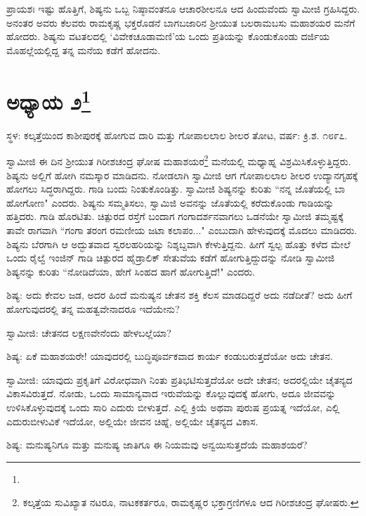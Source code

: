 ಪ್ರಾಯಶಃ ಇಷ್ಟು ಹೊತ್ತಿಗೆ, ಶಿಷ್ಯನು ಒಬ್ಬ ನಿಷ್ಠಾವಂತನೂ ಆಚಾರಶೀಲನೂ ಆದ ಹಿಂದುವೆಂದು ಸ್ವಾಮೀಜಿ ಗ್ರಹಿಸಿದ್ದರು. ಅನಂತರ ಅವರು ಕೆಲವರು ರಾಮಕೃಷ್ಣ ಭಕ್ತರೊಡನೆ ಬಾಗಬಜಾರಿನ ಶ‍್ರೀಯುತ ಬಲರಾಮಬಸು ಮಹಾಶಯರ ಮನೆಗೆ ಹೋದರು. ಶಿಷ್ಯನು ವಟತಲದಲ್ಲಿ ‘ವಿವೇಕಚೂಡಾಮಣಿ’ಯ ಒಂದು ಪ್ರತಿಯನ್ನು ಕೊಂಡುಕೊಂಡು ದರ್ಜಿಯ ಮೊಹಲ್ಲೆಯಲ್ಲಿದ್ದ ತನ್ನ ಮನೆಯ ಕಡೆಗೆ ಹೋದನು.

\newpage

\chapter[ಅಧ್ಯಾಯ ೨]{ಅಧ್ಯಾಯ ೨\protect\footnote{}}

\begin{center}
ಸ್ಥಳ: ಕಲ್ಕತ್ತೆಯಿಂದ ಕಾಶೀಪುರಕ್ಕೆ ಹೋಗುವ ದಾರಿ ಮತ್ತು ಗೋಪಾಲಲಾಲ ಶೀಲರ ತೋಟ, ವರ್ಷ: ಕ್ರಿ.ಶ. ೧೮೯೭.
\end{center}

ಸ್ವಾಮೀಜಿ ಈ ದಿನ ಶ‍್ರೀಯುತ ಗಿರೀಶಚಂದ್ರ ಘೋಷ ಮಹಾಶಯರ\footnote{ಕಲ್ಕತ್ತೆಯ ಸುವಿಖ್ಯಾತ ನಟರೂ, ನಾಟಕಕರ್ತರೂ, ರಾಮಕೃಷ್ಣರ ಭಕ್ತಾಗ್ರಣಿಗಳೂ ಆದ ಗಿರೀಶಚಂದ್ರ ಘೋಷರು.} ಮನೆಯಲ್ಲಿ ಮಧ್ಯಾಹ್ನ ವಿಶ್ರಮಿಸಿಕೊಳ್ಳುತ್ತಿದ್ದರು. ಶಿಷ್ಯನು ಅಲ್ಲಿಗೆ ಹೋಗಿ ನಮಸ್ಕಾರ ಮಾಡಿದನು. ನೋಡಲಾಗಿ ಸ್ವಾಮೀಜಿ ಆಗ ಗೋಪಾಲಲಾಲ ಶೀಲರ ಉದ್ಯಾನಗೃಹಕ್ಕೆ ಹೋಗಲು ಸಿದ್ಧರಾಗಿದ್ದರು. ಗಾಡಿ ಬಂದು ನಿಂತುಕೊಂಡಿತ್ತು. ಸ್ವಾಮೀಜಿ ಶಿಷ್ಯನನ್ನು ಕುರಿತು “ನನ್ನ ಜೊತೆಯಲ್ಲಿ ಬಾ ಹೋಗೋಣ" ಎಂದರು. ಶಿಷ್ಯನು ಸಮ್ಮತಿಸಲು, ಸ್ವಾಮಿಜಿ ಅವನನ್ನು ಜೊತೆಯಲ್ಲಿ ಕರೆದುಕೊಂಡು ಗಾಡಿಯನ್ನು ಹತ್ತಿದರು. ಗಾಡಿ ಹೊರಟಿತು. ಚಿತ್ಪುರದ ರಸ್ತೆಗೆ ಬಂದಾಗ ಗಂಗಾದರ್ಶನವಾಗಲು ಒಡನೆಯೇ ಸ್ವಾಮೀಜಿ ತಮ್ಮಷ್ಟಕ್ಕೆ ತಾವೇ ರಾಗವಾಗಿ “ಗಂಗಾ ತರಂಗ ರಮಣೀಯ ಜಟಾ ಕಲಾಪಂ..." ಎಂಬುದಾಗಿ ಹೇಳುವುದಕ್ಕೆ ಮೊದಲು ಮಾಡಿದರು. ಶಿಷ್ಯನು ಬೆರಗಾಗಿ ಆ ಅದ್ಭುತವಾದ ಸ್ವರಲಹರಿಯನ್ನು ನಿಶ್ಶಬ್ದವಾಗಿ ಕೇಳುತ್ತಿದ್ದನು. ಹೀಗೆ ಸ್ವಲ್ಪ ಹೊತ್ತು ಕಳೆದ ಮೇಲೆ ಒಂದು ರೈಲ್ವೆ ಇಂಜಿನ್ ಗಾಡಿ ಚಿತ್ಪುರದ ಹೈಡ್ರಾಲಿಕ್ ಸೇತುವೆಯ ಕಡೆಗೆ ಹೋಗುತ್ತಿದ್ದುದನ್ನು ನೋಡಿ ಸ್ವಾಮೀಜಿ ಶಿಷ್ಯನನ್ನು ಕುರಿತು “ನೋಡಿದೆಯಾ, ಹೇಗೆ ಸಿಂಹದ ಹಾಗೆ ಹೋಗುತ್ತಿದೆ!" ಎಂದರು.

ಶಿಷ್ಯ: ಅದು ಕೇವಲ ಜಡ, ಅದರ ಹಿಂದೆ ಮನುಷ್ಯನ ಚೇತನ ಶಕ್ತಿ ಕೆಲಸ ಮಾಡದಿದ್ದರೆ ಅದು ನಡೆದೀತೆ? ಅದು ಹೀಗೆ ಹೋಗುವುದರಲ್ಲಿ ತನ್ನ ಮಹತ್ವವೇನಾದರೂ ಇದೆಯೇನು?

ಸ್ವಾಮೀಜಿ: ಚೇತನದ ಲಕ್ಷಣವೇನೆಂದು ಹೇಳಬಲ್ಲೆಯಾ?

ಶಿಷ್ಯ: ಏಕೆ ಮಹಾಶಯರೇ! ಯಾವುದರಲ್ಲಿ ಬುದ್ಧಿಪೂರ್ವಕವಾದ ಕಾರ್ಯ ಕಂಡುಬರುತ್ತದೆಯೋ ಅದು ಚೇತನ.

ಸ್ವಾಮೀಜಿ: ಯಾವುದು ಪ್ರಕೃತಿಗೆ ವಿರೋಧವಾಗಿ ನಿಂತು ಪ್ರತಿಭಟಿಸುತ್ತದೆಯೋ ಅದೇ ಚೇತನ; ಅದರಲ್ಲಿಯೇ ಚೈತನ್ಯದ ವಿಕಾಸವಿರುತ್ತದೆ. ನೋಡು, ಒಂದು ಸಾಮಾನ್ಯವಾದ ಇರುವೆಯನ್ನು ಕೊಲ್ಲುವುದಕ್ಕೆ ಹೋಗು, ಅದೂ ಜೀವವನ್ನು ಉಳಿಸಿಕೊಳ್ಳುವುದಕ್ಕೆ ಒಂದು ಸಾರಿ ಎದುರು ಬೀಳುತ್ತದೆ. ಎಲ್ಲಿ ಕ್ರಿಯೆ ಅಥವಾ ಪುರುಷ ಪ್ರಯತ್ನ ಇದೆಯೋ, ಎಲ್ಲಿ ಎದುರುಬೀಳುವಿಕೆ ಇದೆಯೋ, ಅಲ್ಲಿಯೇ ಜೀವನ ಚಿಹ್ನೆ, ಅಲ್ಲಿಯೇ ಚೈತನ್ಯದ ವಿಕಾಸ.

ಶಿಷ್ಯ: ಮನುಷ್ಯನಿಗೂ ಮತ್ತು ಮನುಷ್ಯ ಜಾತಿಗೂ ಈ ನಿಯಮವು ಅನ್ವಯಿಸುತ್ತದೆಯೆ ಮಹಾಶಯರೆ?

